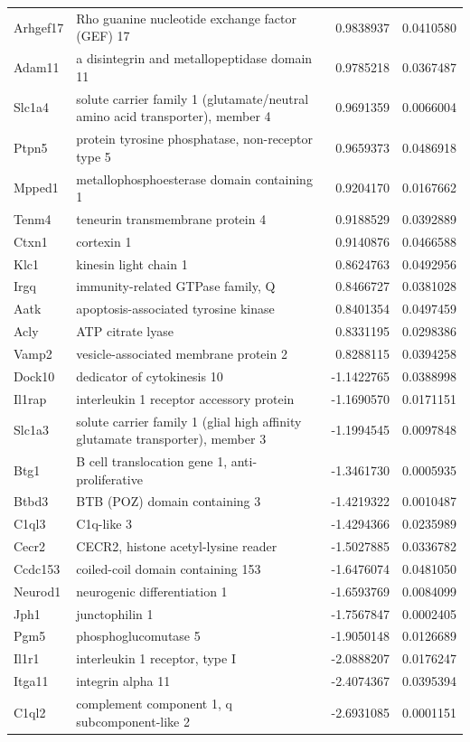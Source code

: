 \documentclass[onehalf,12pt]{beavtex}
\begin{document}
\begin{landscape}
\begin{longtable}{llrr}
  Arhgef17 & Rho guanine nucleotide exchange factor (GEF) 17 & 0.9838937 & 0.0410580\\
  Adam11 & a disintegrin and metallopeptidase domain 11 & 0.9785218 & 0.0367487\\
  Slc1a4 & solute carrier family 1 (glutamate/neutral amino acid transporter), member 4 & 0.9691359 & 0.0066004\\
  \addlinespace
  Ptpn5 & protein tyrosine phosphatase, non-receptor type 5 & 0.9659373 & 0.0486918\\
  Mpped1 & metallophosphoesterase domain containing 1 & 0.9204170 & 0.0167662\\
  Tenm4 & teneurin transmembrane protein 4 & 0.9188529 & 0.0392889\\
  Ctxn1 & cortexin 1 & 0.9140876 & 0.0466588\\
  Klc1 & kinesin light chain 1 & 0.8624763 & 0.0492956\\
  \addlinespace
  Irgq & immunity-related GTPase family, Q & 0.8466727 & 0.0381028\\
  Aatk & apoptosis-associated tyrosine kinase & 0.8401354 & 0.0497459\\
  Acly & ATP citrate lyase & 0.8331195 & 0.0298386\\
  Vamp2 & vesicle-associated membrane protein 2 & 0.8288115 & 0.0394258\\
  Dock10 & dedicator of cytokinesis 10 & -1.1422765 & 0.0388998\\
  \addlinespace
  Il1rap & interleukin 1 receptor accessory protein & -1.1690570 & 0.0171151\\
  Slc1a3 & solute carrier family 1 (glial high affinity glutamate transporter), member 3 & -1.1994545 & 0.0097848\\
  Btg1 & B cell translocation gene 1, anti-proliferative & -1.3461730 & 0.0005935\\
  Btbd3 & BTB (POZ) domain containing 3 & -1.4219322 & 0.0010487\\
  C1ql3 & C1q-like 3 & -1.4294366 & 0.0235989\\
  \addlinespace
  Cecr2 & CECR2, histone acetyl-lysine reader & -1.5027885 & 0.0336782\\
  Ccdc153 & coiled-coil domain containing 153 & -1.6476074 & 0.0481050\\
  Neurod1 & neurogenic differentiation 1 & -1.6593769 & 0.0084099\\
  Jph1 & junctophilin 1 & -1.7567847 & 0.0002405\\
  Pgm5 & phosphoglucomutase 5 & -1.9050148 & 0.0126689\\
  \addlinespace
  Il1r1 & interleukin 1 receptor, type I & -2.0888207 & 0.0176247\\
  Itga11 & integrin alpha 11 & -2.4074367 & 0.0395394\\
  C1ql2 & complement component 1, q subcomponent-like 2 & -2.6931085 & 0.0001151\\*
  \end{longtable}
  
  \end{landscape}
  
\end{document}

